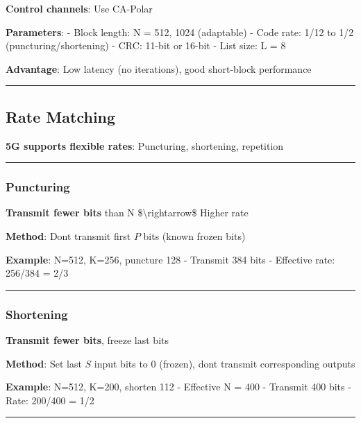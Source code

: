 \textbf{Control channels}: Use CA-Polar

\textbf{Parameters}: - Block length: N = 512, 1024 (adaptable) - Code
rate: 1/12 to 1/2 (puncturing/shortening) - CRC: 11-bit or 16-bit - List
size: L = 8

\textbf{Advantage}: Low latency (no iterations), good short-block
performance

\begin{center}\rule{0.5\linewidth}{0.5pt}\end{center}

\subsection{Rate Matching}\label{rate-matching}

\textbf{5G supports flexible rates}: Puncturing, shortening, repetition

\begin{center}\rule{0.5\linewidth}{0.5pt}\end{center}

\subsubsection{Puncturing}\label{puncturing}

\textbf{Transmit fewer bits} than N \$\textbackslash rightarrow\$ Higher
rate

\textbf{Method}: Don\textquotesingle t transmit first \(P\) bits (known
frozen bits)

\textbf{Example}: N=512, K=256, puncture 128 - Transmit 384 bits -
Effective rate: 256/384 = 2/3

\begin{center}\rule{0.5\linewidth}{0.5pt}\end{center}

\subsubsection{Shortening}\label{shortening}

\textbf{Transmit fewer bits}, freeze last bits

\textbf{Method}: Set last \(S\) input bits to 0 (frozen),
don\textquotesingle t transmit corresponding outputs

\textbf{Example}: N=512, K=200, shorten 112 - Effective N = 400 -
Transmit 400 bits - Rate: 200/400 = 1/2

\begin{center}\rule{0.5\linewidth}{0.5pt}\end{center}

